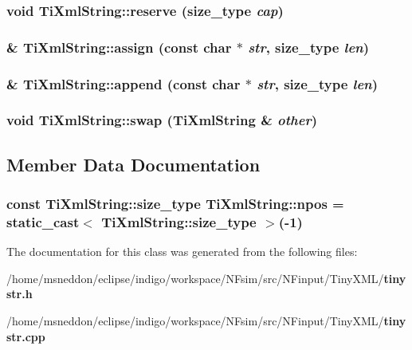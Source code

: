 \subsubsection{\setlength{\rightskip}{0pt plus 5cm}void TiXmlString::reserve ({\bf size\_\-type} {\em cap})}\label{classTiXmlString_88ecf9f0f00cb5c67b6b637958d7049c}


\subsubsection{ \& TiXmlString::assign (const char $\ast$ {\em str}, {\bf size\_\-type} {\em len})}\label{classTiXmlString_c72f3d9149b7812c1e6c59402014d0d5}


\subsubsection{ \& TiXmlString::append (const char $\ast$ {\em str}, {\bf size\_\-type} {\em len})}\label{classTiXmlString_d44b21700d2ec24a511367b222b643fb}


\subsubsection{\setlength{\rightskip}{0pt plus 5cm}void TiXmlString::swap ({\bf TiXmlString} \& {\em other})\hspace{0.3cm}{\tt  [inline]}}\label{classTiXmlString_a392cbc180752a79f007f4f9280c7762}




\subsection{Member Data Documentation}
\subsubsection{\setlength{\rightskip}{0pt plus 5cm}const {\bf TiXmlString::size\_\-type} {\bf TiXmlString::npos} = static\_\-cast$<$ {\bf TiXmlString::size\_\-type} $>$(-1)\hspace{0.3cm}{\tt  [static]}}\label{classTiXmlString_8f4422d227088dc7bec96f479b275d0a}




The documentation for this class was generated from the following files:\begin{CompactItemize}
\item 
/home/msneddon/eclipse/indigo/workspace/NFsim/src/NFinput/TinyXML/{\bf tinystr.h}\item 
/home/msneddon/eclipse/indigo/workspace/NFsim/src/NFinput/TinyXML/{\bf tinystr.cpp}\end{CompactItemize}
